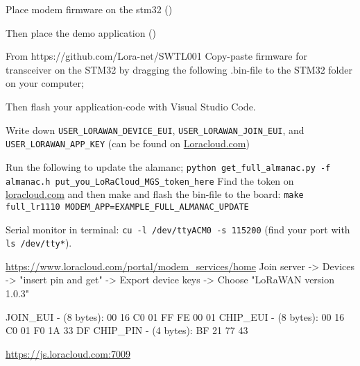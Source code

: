 Place modem firmware on the stm32 ()


Then place the demo application ()


From https://github.com/Lora-net/SWTL001
Copy-paste firmware for transceiver on the STM32 by dragging the following .bin-file to the STM32 folder on your computer; 

Then flash your application-code with Visual Studio Code.


Write down \lstinline[style=bash]{USER_LORAWAN_DEVICE_EUI}, \lstinline[style=bash]{USER_LORAWAN_JOIN_EUI}, and \lstinline[style=bash]{USER_LORAWAN_APP_KEY} (can be found on \url{Loracloud.com})

Run the following to update the alamanc; \lstinline[style=python]{python get_full_almanac.py -f almanac.h put_you_LoRaCloud_MGS_token_here}
Find the token on \url{loracloud.com}
and then make and flash the bin-file to the board: \lstinline[style=bash]{make full_lr1110 MODEM_APP=EXAMPLE_FULL_ALMANAC_UPDATE}



Serial monitor in terminal: \lstinline[style=bash]{cu -l /dev/ttyACM0 -s 115200} (find your port with \lstinline[style=bash]{ls /dev/tty*}).

\url{https://www.loracloud.com/portal/modem_services/home}
Join server -> Devices -> "insert pin and get" -> Export device keys -> Choose "LoRaWAN version 1.0.3"


JOIN\_EUI - (8 bytes):
 00 16 C0 01 FF FE 00 01
CHIP\_EUI - (8 bytes):
 00 16 C0 01 F0 1A 33 DF
CHIP\_PIN - (4 bytes):
 BF 21 77 43
 
 
\url{https://js.loracloud.com:7009}